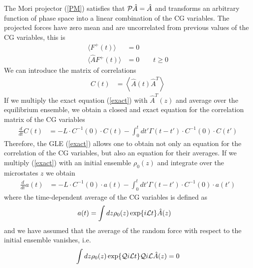 \documentclass[a4paper,openright,12pt]{book}
\newcommand{\esc}{\!\cdot\!}
\newcommand{\llangle}{\left\langle}
\newcommand{\rrangle}{\right\rangle}
\begin{document}
The  Mori  projector  (\ref{PM})   satisfies  that  ${\cal  P}\hat{A}=
\hat{A}$ and  transforms an arbitrary  function of phase space  into a
linear combination  of the  CG variables.   The projected  forces have
zero  mean  and  are  uncorrelated  from
previous values of the CG variables, this is 
\begin{align}
\langle  F^+  (t)\rangle&=0  
\nonumber\\
\langle \hat{A} F^+ (t)\rangle&=0 \quad\quad t\ge 0
\end{align}
We can introduce the matrix of correlations 
\begin{align}
  C(t)&=  \llangle \hat{A}(t)\hat{A}^T\rrangle
\end{align}
If we multiply the  exact equation (\ref{exact})  with $\hat{A}^T(z)$
and  average over  the equilibrium  ensemble, we  obtain a  closed and
exact equation for the correlation matrix of the CG variables
\begin{align}
  \frac{d}{dt}C(t)&=-L\esc C^{-1}(0)\esc C(t)
-\int_0^tdt' \Gamma(t-t')\esc C^{-1}(0)\esc  C(t')
\label{exactC}
\end{align}
Therefore, the GLE (\ref{exact}) allows  one to obtain not only an equation for the correlation of the CG variables, but also an equation for  their averages. 
If we multiply  (\ref{exact}) with an initial ensemble $\rho_0(z)$ and integrate over the microstates $z$ we obtain
\begin{align}
  \frac{d}{dt}a(t) &= -L\esc C^{-1}(0)\esc a(t)
  -\int_0^tdt' \Gamma(t-t')\esc  C^{-1}(0)\esc a(t')
\label{exactAve}
\end{align}
where the time-dependent average of the CG variables is defined as
\begin{align}
  a(t)&=\int dz \rho_0(z) \exp\{i{\cal L}t\}\hat{A}(z)
\end{align}
and we have assumed that the average of the random force with respect
to the initial ensemble vanishes, i.e.
\begin{align}
\int dz\rho_0(z)\exp\{{\cal Q}i{\cal L}t\} {\cal Q}i{\cal L}\hat{A}(z)=0
\label{F0}
\end{align}
\end{document}

